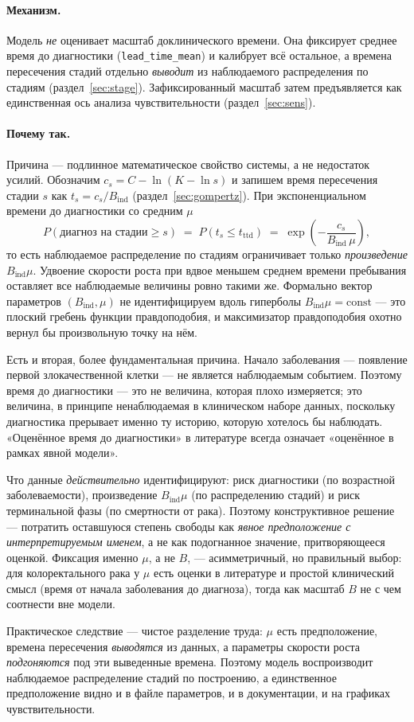 \documentclass[12pt,a4paper]{article}
\newcommand{\id}[1]{\texttt{#1}}
\newcommand{\mech}[1]{\paragraph{Механизм.} #1}
\newcommand{\why}[1]{\paragraph{Почему так.} #1}
\begin{document}
\mech{Модель \emph{не} оценивает масштаб доклинического времени. Она фиксирует среднее время до диагностики
(\id{lead\_time\_mean}) и калибрует всё остальное, а времена пересечения стадий отдельно \emph{выводит} из
наблюдаемого распределения по стадиям (раздел~\ref{sec:stage}). Зафиксированный масштаб затем предъявляется
как единственная ось анализа чувствительности (раздел~\ref{sec:sens}).}

\why{Причина --- подлинное математическое свойство системы, а не недостаток усилий. Обозначим
$c_s = C - \ln(K - \ln s)$ и запишем время пересечения стадии $s$ как $t_s = c_s / B_{\text{ind}}$
(раздел~\ref{sec:gompertz}). При экспоненциальном времени до диагностики со средним $\mu$
\[
P(\text{диагноз на стадии} \ge s) \;=\; P(t_s \le t_{\text{ttd}}) \;=\; \exp\!\left(-\frac{c_s}{B_{\text{ind}}\,\mu}\right),
\]
то есть наблюдаемое распределение по стадиям ограничивает только \emph{произведение}
$B_{\text{ind}}\mu$. Удвоение скорости роста при вдвое меньшем среднем времени пребывания оставляет все
наблюдаемые величины ровно такими же. Формально вектор параметров $(B_{\text{ind}}, \mu)$ не идентифицируем
вдоль гиперболы $B_{\text{ind}}\mu = \text{const}$ --- это плоский гребень функции правдоподобия, и
максимизатор правдоподобия охотно вернул бы произвольную точку на нём.

Есть и вторая, более фундаментальная причина. Начало заболевания --- появление первой злокачественной
клетки --- не является наблюдаемым событием. Поэтому время до диагностики --- это не величина, которая
плохо измеряется; это величина, в принципе ненаблюдаемая в клиническом наборе данных, поскольку диагностика
прерывает именно ту историю, которую хотелось бы наблюдать. «Оценённое время до диагностики» в литературе
всегда означает «оценённое в рамках явной модели».

Что данные \emph{действительно} идентифицируют: риск диагностики (по возрастной заболеваемости),
произведение $B_{\text{ind}}\mu$ (по распределению стадий) и риск терминальной фазы (по смертности от рака).
Поэтому конструктивное решение --- потратить оставшуюся степень свободы как \emph{явное предположение с
интерпретируемым именем}, а не как подогнанное значение, притворяющееся оценкой. Фиксация именно $\mu$, а не
$B$, --- асимметричный, но правильный выбор: для колоректального рака у $\mu$ есть оценки в литературе и
простой клинический смысл (время от начала заболевания до диагноза), тогда как масштаб $B$ не с чем
соотнести вне модели.

Практическое следствие --- чистое разделение труда: $\mu$ есть предположение, времена пересечения
\emph{выводятся} из данных, а параметры скорости роста \emph{подгоняются} под эти выведенные времена.
Поэтому модель воспроизводит наблюдаемое распределение стадий по построению, а единственное предположение
видно и в файле параметров, и в документации, и на графиках чувствительности.}
\end{document}
